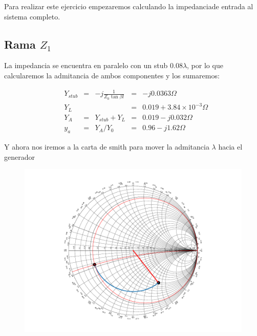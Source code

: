 
Para realizar este ejercicio empezaremos calculando la impedanciade entrada al sistema completo.
\subsection{Rama $Z_1$}
La impedancia se encuentra en paralelo con un stub $0.08\lambda$, por lo que calcularemos la admitancia de ambos componentes y los sumaremos:

\begin{align*}
&  Y_{stub} &=& -j \frac{1}{Z_0 \tan{\beta l}} &=& -j0.0363 \Omega \\
&  Y_L && &=& 0.019 +3.8 4 \times 10^{-3} \Omega \\
&  Y_{A} &=& Y_{stub} + Y_L &=& 0.019 -j0.032\Omega \\
&  y_{a} &=& Y_{A} / Y_{0} &=& 0.96 -j1.62 \Omega
\end{align*}

Y ahora nos iremos a la carta de smith para mover la admitancia $\lambda$ hacia el generador
\begin{figure}[h]
  \centering
  \includegraphics[scale = 0.75]{ej10/images/out1.pdf}
  \label{ej2smith}
\end{figure}


